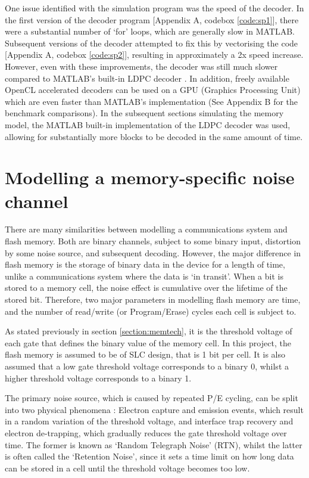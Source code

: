 \documentclass[11pt]{article}
\numberwithin{equation}{subsection}
\begin{document}
One issue identified with the simulation program was the speed of the decoder. In the first version of the decoder program [Appendix A, codebox \ref{code:sp1}], there were a substantial number of `for' loops, which are generally slow in MATLAB. Subsequent versions of the decoder attempted to fix this by vectorising the code [Appendix A, codebox \ref{code:sp2}], resulting in approximately a 2x speed increase. However, even with these improvements, the decoder was still much slower compared to MATLAB's built-in LDPC decoder \cite{matlab-ldpc}. In addition, freely available OpenCL accelerated decoders \cite{openCL} can be used on a GPU (Graphics Processing Unit) which are even faster than MATLAB's implementation (See Appendix B for the benchmark comparisons). In the subsequent sections simulating the memory model, the MATLAB built-in implementation of the LDPC decoder was used, allowing for substantially more blocks to be decoded in the same amount of time.

\section{Modelling a memory-specific noise channel} \label{section:memory}
There are many similarities between modelling a communications system and flash memory. Both are binary channels, subject to some binary input, distortion by some noise source, and subsequent decoding. However, the major difference in flash memory is the storage of binary data in the device for a length of time, unlike a communications system where the data is `in transit'. When a bit is stored to a memory cell, the noise effect is cumulative over the lifetime of the stored bit. Therefore, two major parameters in modelling flash memory are time, and the number of read/write (or Program/Erase) cycles each cell is subject to.

As stated previously in section \ref{section:memtech}, it is the threshold voltage of each gate that defines the binary value of the memory cell. In this project, the flash memory is assumed to be of SLC design, that is 1 bit per cell. It is also assumed that a low gate threshold voltage corresponds to a binary 0, whilst a higher threshold voltage corresponds to a binary 1. 

The primary noise source, which is caused by repeated P/E cycling, can be split into two physical phenomena \cite{dong2012estimating}: Electron capture and emission events, which result in a random variation of the threshold voltage, and interface trap recovery and electron de-trapping, which gradually reduces the gate threshold voltage over time. The former is known as `Random Telegraph Noise' (RTN), whilst the latter is often called the `Retention Noise', since it sets a time limit on how long data can be stored in a cell until the threshold voltage becomes too low.
\end{document}
